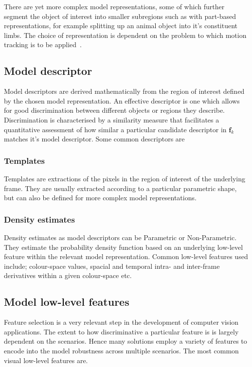 There are yet more complex model representations, some of which further segment
the object of interest into smaller subregions such as with part-based
representations, for example splitting up an animal object into it's constituent
limbs. The choice of representation is dependent on the problem to which motion
tracking is to be applied~\cite{Porikli2012}.

\subsection{Model descriptor}\label{literature_review_descriptors}
Model descriptors are derived mathematically from the region of interest defined
by the chosen model representation. An effective descriptor is one which allows
for good discrimination between different objects or regions they
describe. Discrimination is characterised by a similarity measure that
facilitates a quantitative assessment of how similar a particular candidate
descriptor in $\mathbf{f}_{k}$ matches it's model descriptor.
Some common descriptors are

\subsubsection{Templates}\label{literature_review_template}
Templates are extractions of the pixels in the region of interest of the
underlying frame. They are usually extracted according to a particular
parametric shape, but can also be defined for more complex model representations.

\subsubsection{Density estimates}
Density estimates as model descriptors can be Parametric or Non-Parametric. They
estimate the probability density function based on an underlying low-level
feature within the relevant model representation.
Common low-level features used include; colour-space values, spacial and
temporal intra- and inter-frame derivatives within a given colour-space etc.

\subsection{Model low-level features}
Feature selection is a very relevant step in the development of computer vision
applications. The extent to how discriminative a particular feature is is
largely dependent on the scenarios. Hence many solutions employ a
variety of features to encode into the model robustness across multiple
scenarios. The most common visual low-level features are.

